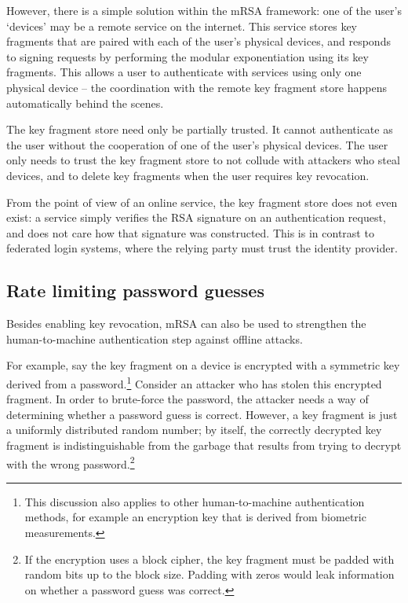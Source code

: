 However, there is a simple solution within the mRSA framework: one of the user's `devices' may be a
remote service on the internet. This service stores key fragments that are paired with each of the
user's physical devices, and responds to signing requests by performing the modular exponentiation
using its key fragments. This allows a user to authenticate with services using only one physical
device -- the coordination with the remote key fragment store happens automatically behind the
scenes.

The key fragment store need only be partially trusted. It cannot authenticate as the user without
the cooperation of one of the user's physical devices. The user only needs to trust the key fragment
store to not collude with attackers who steal devices, and to delete key fragments when the user
requires key revocation.

From the point of view of an online service, the key fragment store does not even exist: a service
simply verifies the RSA signature on an authentication request, and does not care how that signature
was constructed. This is in contrast to federated login systems, where the relying party must trust
the identity provider.

\subsection{Rate limiting password guesses}\label{sec:ratelimit}

Besides enabling key revocation, mRSA can also be used to strengthen the human-to-machine
authentication step against offline attacks.

For example, say the key fragment on a device is encrypted with a symmetric key derived from a
password.\footnote{This discussion also applies to other human-to-machine authentication methods,
for example an encryption key that is derived from biometric measurements.} Consider an attacker who
has stolen this encrypted fragment. In order to brute-force the password, the attacker needs a way
of determining whether a password guess is correct. However, a key fragment is just a uniformly
distributed random number; by itself, the correctly decrypted key fragment is indistinguishable from
the garbage that results from trying to decrypt with the wrong password.\footnote{If the encryption
uses a block cipher, the key fragment must be padded with random bits up to the block size. Padding
with zeros would leak information on whether a password guess was correct.}

